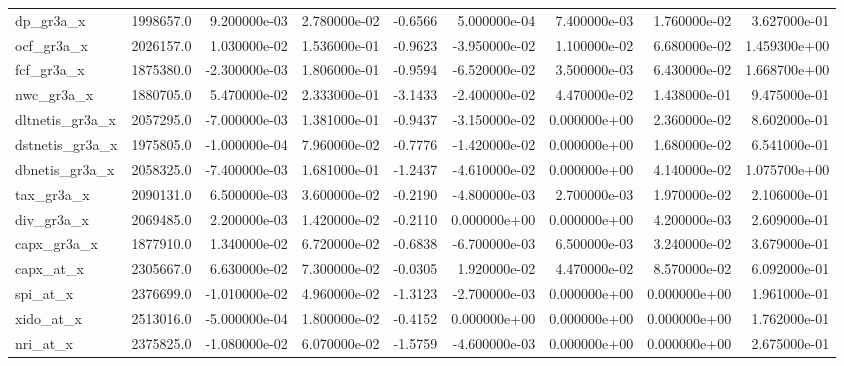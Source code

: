 \documentclass[10pt]{article}
\begin{document}
\begin{landscape}
\begin{longtable}{|l|r|r|r|r|r|r|r|r|}
dp\_gr3a\_x               &  1998657.0 &  9.200000e-03 &  2.780000e-02 &     -0.6566 &  5.000000e-04 &  7.400000e-03 &  1.760000e-02 &  3.627000e-01 \\
ocf\_gr3a\_x              &  2026157.0 &  1.030000e-02 &  1.536000e-01 &     -0.9623 & -3.950000e-02 &  1.100000e-02 &  6.680000e-02 &  1.459300e+00 \\
fcf\_gr3a\_x              &  1875380.0 & -2.300000e-03 &  1.806000e-01 &     -0.9594 & -6.520000e-02 &  3.500000e-03 &  6.430000e-02 &  1.668700e+00 \\
nwc\_gr3a\_x              &  1880705.0 &  5.470000e-02 &  2.333000e-01 &     -3.1433 & -2.400000e-02 &  4.470000e-02 &  1.438000e-01 &  9.475000e-01 \\
dltnetis\_gr3a\_x         &  2057295.0 & -7.000000e-03 &  1.381000e-01 &     -0.9437 & -3.150000e-02 &  0.000000e+00 &  2.360000e-02 &  8.602000e-01 \\
dstnetis\_gr3a\_x         &  1975805.0 & -1.000000e-04 &  7.960000e-02 &     -0.7776 & -1.420000e-02 &  0.000000e+00 &  1.680000e-02 &  6.541000e-01 \\
dbnetis\_gr3a\_x          &  2058325.0 & -7.400000e-03 &  1.681000e-01 &     -1.2437 & -4.610000e-02 &  0.000000e+00 &  4.140000e-02 &  1.075700e+00 \\
tax\_gr3a\_x              &  2090131.0 &  6.500000e-03 &  3.600000e-02 &     -0.2190 & -4.800000e-03 &  2.700000e-03 &  1.970000e-02 &  2.106000e-01 \\
div\_gr3a\_x              &  2069485.0 &  2.200000e-03 &  1.420000e-02 &     -0.2110 &  0.000000e+00 &  0.000000e+00 &  4.200000e-03 &  2.609000e-01 \\
capx\_gr3a\_x             &  1877910.0 &  1.340000e-02 &  6.720000e-02 &     -0.6838 & -6.700000e-03 &  6.500000e-03 &  3.240000e-02 &  3.679000e-01 \\
capx\_at\_x               &  2305667.0 &  6.630000e-02 &  7.300000e-02 &     -0.0305 &  1.920000e-02 &  4.470000e-02 &  8.570000e-02 &  6.092000e-01 \\
spi\_at\_x                &  2376699.0 & -1.010000e-02 &  4.960000e-02 &     -1.3123 & -2.700000e-03 &  0.000000e+00 &  0.000000e+00 &  1.961000e-01 \\
xido\_at\_x               &  2513016.0 & -5.000000e-04 &  1.800000e-02 &     -0.4152 &  0.000000e+00 &  0.000000e+00 &  0.000000e+00 &  1.762000e-01 \\
nri\_at\_x                &  2375825.0 & -1.080000e-02 &  6.070000e-02 &     -1.5759 & -4.600000e-03 &  0.000000e+00 &  0.000000e+00 &  2.675000e-01 \\

\end{longtable}
\end{landscape}
\end{document}
